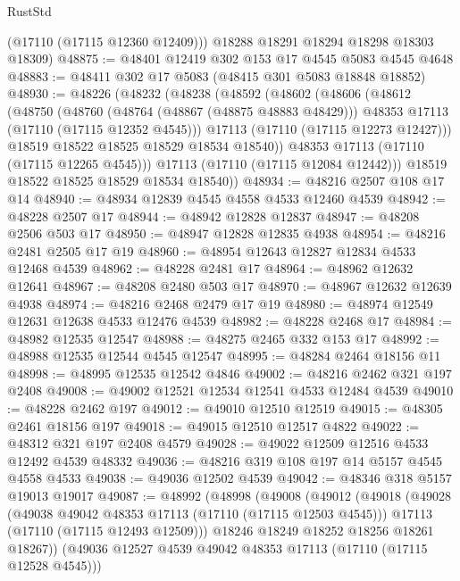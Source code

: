 \begin{lexlean}{RustStd}
\begin{coremodule}
        (@17110 (@17115 @12360 @12409)))
      @18288
      @18291
      @18294
      @18298
      @18303
      @18309)
@48875 := @48401 @12419 @302 @153 @17 @4545 @5083 @4545 @4648
@48883 := @48411 @302 @17 @5083 (@48415 @301 @5083 @18848 @18852)
@48930 := @48226
    (@48232
      (@48238
        (@48592
          (@48602
            (@48606
              (@48612
                (@48750
                  (@48760
                    (@48764 (@48867 (@48875 @48883 @48429)))
                    @48353
                    @17113
                    (@17110 (@17115 @12352 @4545)))
                  @17113
                  (@17110 (@17115 @12273 @12427)))
                @18519
                @18522
                @18525
                @18529
                @18534
                @18540))
            @48353
            @17113
            (@17110 (@17115 @12265 @4545)))
          @17113
          (@17110 (@17115 @12084 @12442)))
        @18519
        @18522
        @18525
        @18529
        @18534
        @18540))
@48934 := @48216 @2507 @108 @17 @14
@48940 := @48934 @12839 @4545 @4558 @4533 @12460 @4539
@48942 := @48228 @2507 @17
@48944 := @48942 @12828 @12837
@48947 := @48208 @2506 @503 @17
@48950 := @48947 @12828 @12835 @4938
@48954 := @48216 @2481 @2505 @17 @19
@48960 := @48954 @12643 @12827 @12834 @4533 @12468 @4539
@48962 := @48228 @2481 @17
@48964 := @48962 @12632 @12641
@48967 := @48208 @2480 @503 @17
@48970 := @48967 @12632 @12639 @4938
@48974 := @48216 @2468 @2479 @17 @19
@48980 := @48974 @12549 @12631 @12638 @4533 @12476 @4539
@48982 := @48228 @2468 @17
@48984 := @48982 @12535 @12547
@48988 := @48275 @2465 @332 @153 @17
@48992 := @48988 @12535 @12544 @4545 @12547
@48995 := @48284 @2464 @18156 @11
@48998 := @48995 @12535 @12542 @4846
@49002 := @48216 @2462 @321 @197 @2408
@49008 := @49002 @12521 @12534 @12541 @4533 @12484 @4539
@49010 := @48228 @2462 @197
@49012 := @49010 @12510 @12519
@49015 := @48305 @2461 @18156 @197
@49018 := @49015 @12510 @12517 @4822
@49022 := @48312 @321 @197 @2408 @4579
@49028 := @49022 @12509 @12516 @4533 @12492 @4539 @48332
@49036 := @48216 @319 @108 @197 @14 @5157 @4545 @4558 @4533
@49038 := @49036 @12502 @4539
@49042 := @48346 @318 @5157 @19013 @19017
@49087 := @48992
    (@48998
      (@49008
        (@49012
          (@49018
            (@49028
              (@49038 @49042 @48353 @17113 (@17110 (@17115 @12503 @4545)))
              @17113
              (@17110 (@17115 @12493 @12509)))
            @18246
            @18249
            @18252
            @18256
            @18261
            @18267))
        (@49036 @12527 @4539 @49042 @48353 @17113 (@17110 (@17115 @12528 @4545)))

\end{coremodule}
\end{lexlean}
